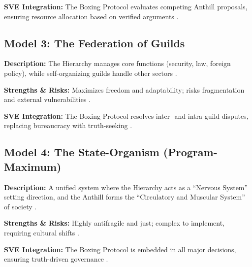 \documentclass[11pt,a4paper]{article}
\begin{document}
\begin{small}
\textbf{SVE Integration:} The Boxing Protocol evaluates competing Anthill proposals, ensuring resource allocation based on verified arguments \citep[lines 2287--2289]{HybridModelsMemo}.

\subsection{Model 3: The Federation of Guilds}
\textbf{Description:} The Hierarchy manages core functions (security, law, foreign policy), while self-organizing guilds handle other sectors \citep[lines 2292--2293]{HybridModelsMemo}.

\textbf{Strengths \& Risks:} Maximizes freedom and adaptability; risks fragmentation and external vulnerabilities \citep[lines 2294--2295]{HybridModelsMemo}.

\textbf{SVE Integration:} The Boxing Protocol resolves inter- and intra-guild disputes, replacing bureaucracy with truth-seeking \citep[lines 2297]{HybridModelsMemo}.

\subsection{Model 4: The State-Organism (Program-Maximum)}
\textbf{Description:} A unified system where the Hierarchy acts as a ``Nervous System'' setting direction, and the Anthill forms the ``Circulatory and Muscular System'' of society \citep[lines 2299--2303]{HybridModelsMemo}.

\textbf{Strengths \& Risks:} Highly antifragile and just; complex to implement, requiring cultural shifts \citep[lines 2304--2308]{HybridModelsMemo}.

\textbf{SVE Integration:} The Boxing Protocol is embedded in all major decisions, ensuring truth-driven governance \citep[lines 2310]{HybridModelsMemo}.

\begin{figure}[h!]
\centering
{}
\end{figure}
\end{small}
\end{document}
